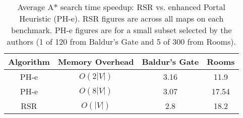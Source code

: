 \begin{table}[tb]
\label{table:phspeedup}
\begin{center}
\begin{tabular}{|c|c|c|c|}
\hline
\textbf{Algorithm} & \textbf{Memory Overhead} & \textbf{Baldur's Gate} & \textbf{Rooms}  \\ \hline
PH-e & $O(2|V|)$ & 3.16 &  11.9 \\ \hline
PH-e & $O(8|V|)$ & 3.07 &  17.54 \\ \hline
RSR & $O(|V|)$ & 2.8 & 18.2 \\ \hline
\end{tabular}
\end{center}
\caption{Average A* search time speedup: RSR vs. enhanced Portal
Heuristic (PH-e). RSR figures are across all maps on each benchmark. PH-e
figures are for a small subset selected by the authors \cite{goldenberg10} (1 of 120 from
Baldur's Gate and 5 of 300 from Rooms). }
\end{table}
